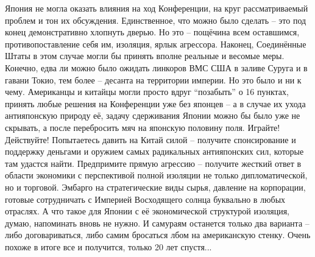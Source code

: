Япония не могла оказать влияния на ход Конференции, на круг рассматриваемый проблем и тон их обсуждения. Единственное, что можно было сделать – это под конец демонстративно хлопнуть дверью. Но это – пощёчина всем оставшимся, противопоставление себя им, изоляция, ярлык агрессора. Наконец, Соединённые Штаты в этом случае могли бы принять вполне реальные и весомые меры. Конечно, едва ли можно было ожидать линкоров ВМС США в заливе Суруга и в гавани Токио, тем более – десанта на территории империи. Но это было и ни к чему. Американцы и китайцы могли просто вдруг “позабыть” о 16 пунктах, принять любые решения на Конференции уже без японцев – а в случае их ухода антияпонскую природу её, задачу сдерживания Японии можно бы было уже не скрывать, а после перебросить мяч на японскую половину поля. Играйте! Действуйте! Попытаетесь давить на Китай силой – получите спонсирование и поддержку деньгами и оружием самых радикальных антияпонских сил, которые там удастся найти. Предпримите прямую агрессию – получите жесткий ответ в области экономики с перспективой полной изоляции не только дипломатической, но и торговой. Эмбарго на стратегические виды сырья, давление на корпорации, готовые сотрудничать с Империей Восходящего солнца буквально в любых отраслях. А что такое для Японии с её экономической структурой изоляция, думаю, напоминать вновь не нужно. И самураям останется только два варианта – либо договариваться, либо самим бросаться лбом на американскую стенку. Очень похоже в итоге все и получится, только 20 лет спустя...

